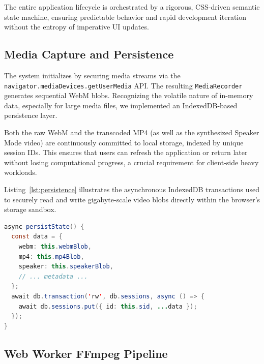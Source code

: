 \documentclass[10pt,twocolumn,letterpaper]{article}
\begin{document}
The entire application lifecycle is orchestrated by a rigorous, CSS-driven semantic state machine, ensuring predictable behavior and rapid development iteration without the entropy of imperative UI updates.


\subsection{Media Capture and Persistence}

The system initializes by securing media streams via the \texttt{navigator.mediaDevices.getUserMedia} API. The resulting \texttt{MediaRecorder} generates sequential WebM blobs. Recognizing the volatile nature of in-memory data, especially for large media files, we implemented an IndexedDB-based persistence layer.

Both the raw WebM and the transcoded MP4 (as well as the synthesized Speaker Mode video) are continuously committed to local storage, indexed by unique session IDs. This ensures that users can refresh the application or return later without losing computational progress, a crucial requirement for client-side heavy workloads.

Listing~\ref{lst:persistence} illustrates the asynchronous IndexedDB transactions used to securely read and write gigabyte-scale video blobs directly within the browser's storage sandbox.



\begin{lstlisting}[language=java,breaklines=true,breakatwhitespace=true,basicstyle=\ttfamily\small,caption={Asynchronous IndexedDB transactions for large media blob persistence.},label={lst:persistence}]
async persistState() {
  const data = {
    webm: this.webmBlob,
    mp4: this.mp4Blob,
    speaker: this.speakerBlob,
    // ... metadata ...
  };
  await db.transaction('rw', db.sessions, async () => {
    await db.sessions.put({ id: this.sid, ...data });
  });
}
\end{lstlisting}


\subsection{Web Worker FFmpeg Pipeline}
\end{document}
